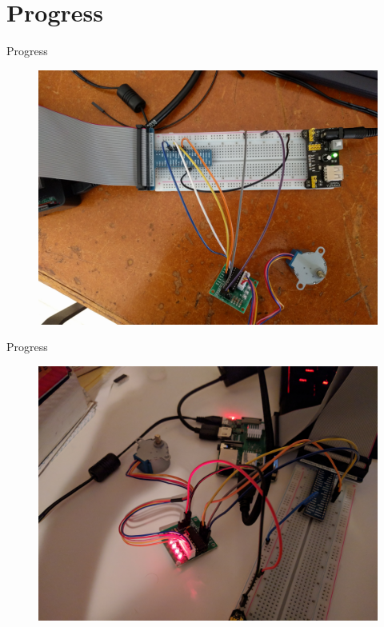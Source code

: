 \documentclass{beamer}
\begin{document}
\section{Progress}
\begin{frame}{Progress}
\begin{figure}
\includegraphics[scale=0.05]{../figs/labStepper}
\end{figure}
\end{frame}

\begin{frame}{Progress}
\begin{figure}
\includegraphics[scale=0.05]{../figs/homeStepperMotor}
\end{figure}
\end{frame}
\end{document}
